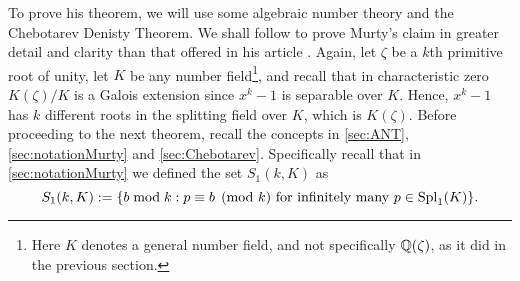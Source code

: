 \documentclass[../main.tex]{subfiles}
\begin{document}
To prove his theorem, we will use some algebraic number theory and the Chebotarev Denisty Theorem. We shall follow \cite{Conrad} to prove Murty's claim in greater detail and clarity than that offered in his article \cite{Murty}. Again, let $\zeta$ be a $k$th primitive root of unity, let $K$ be any number field\footnote{Here $K$ denotes a general number field, and not specifically $\mathbb{Q}(\zeta)$, as it did in the previous section.}, and recall that in characteristic zero $K(\zeta)/K$ is a Galois extension since $x^k-1$ is separable over $K$. Hence, $x^k-1$ has $k$ different roots in the splitting field over $K$, which is $K(\zeta)$. Before proceeding to the next theorem, recall the concepts in \cref{sec:ANT}, \cref{sec:notationMurty} and \cref{sec:Chebotarev}. Specifically recall that in \cref{sec:notationMurty} we defined the set $S_1(k,K)$ as
\begin{equation}\label{eq:S1fisrtdef}
	S_1(k,K):=\{b \bmod{k}: p\equiv b \pmod{k} \ \text{for infinitely many $p\in\operatorname{Spl}_1(K)$}\}.
\end{equation}
\end{document}
